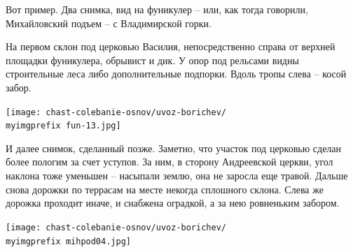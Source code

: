 Вот пример. Два снимка, вид на фуникулер – или, как тогда говорили, Михайловский подъем – с Владимирской горки. 

На первом склон под церковью Василия, непосредственно справа от верхней площадки фуникулера, обрывист и дик. У опор под рельсами видны строительные леса либо дополнительные подпорки. Вдоль тропы слева – косой забор.

\begin{center}
\texttt{[image: chast-colebanie-osnov/uvoz-borichev/\\myimgprefix fun-13.jpg]}
\end{center}

И далее снимок, сделанный позже. Заметно, что участок под церковью сделан более пологим за счет уступов. За ним, в сторону Андреевской церкви, угол наклона тоже уменьшен – насыпали землю, она не заросла еще травой. Дальше снова дорожки по террасам на месте некогда сплошного склона. Слева же дорожка проходит иначе, и снабжена оградкой, а за нею ровненьким забором.

\begin{center}
\texttt{[image: chast-colebanie-osnov/uvoz-borichev/\\myimgprefix mihpod04.jpg]}
\end{center}
